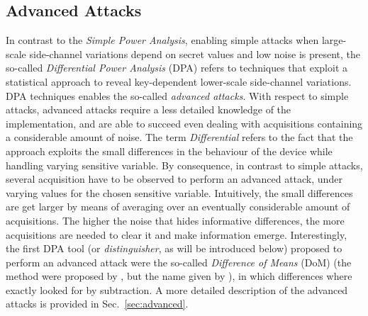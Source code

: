 \subsection{Advanced Attacks} 
In contrast to the \emph{Simple Power Analysis}, enabling simple attacks when large-scale side-channel variations depend on secret values and low noise is present, the so-called \emph{Differential Power Analysis} (DPA) refers to techniques that exploit  a statistical approach to reveal key-dependent lower-scale side-channel variations. DPA techniques enables the so-called \emph{advanced attacks}. With respect to simple attacks, advanced attacks  require a less detailed knowledge of the implementation, and are able to succeed even dealing with acquisitions containing a considerable amount of noise. The term \emph{Differential} refers to the fact that the approach exploits the small differences in the behaviour of the device while handling varying sensitive variable. By consequence, in contrast to simple attacks,  several acquisition have to be observed to perform an advanced attack, under varying values for the chosen sensitive variable. Intuitively, the small differences are get larger by means of averaging over an eventually considerable amount of acquisitions. The higher the noise that hides informative differences, the more acquisitions are needed to clear it and make information emerge. Interestingly, the first DPA tool (or \emph{distinguisher}, as will be introduced below) proposed to perform an advanced attack were the so-called \emph{Difference of Means} (DoM) (the method were proposed by \cite{kocher1999differential}, but the name given by \cite{Chari2003}),  in which differences where exactly looked for by subtraction. A more detailed description of the advanced attacks is provided in Sec.~\ref{sec:advanced}.\\



